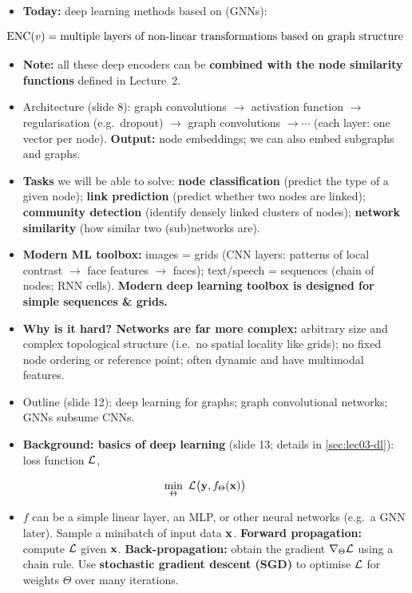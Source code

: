 \begin{itemize}
  \item \textbf{Today:} deep learning methods based on  (GNNs):
\end{itemize}
\begin{equation}\label{eq:lec03-enc}
  \operatorname{ENC}(v) = \text{multiple layers of non-linear transformations based on graph structure}
\end{equation}
\begin{itemize}
  \item \textbf{Note:} all these deep encoders can be \textbf{combined with the
    node similarity functions} defined in Lecture~2.
  \item Architecture (slide 8): graph convolutions $\to$ activation function
    $\to$ regularisation (e.g.\ dropout) $\to$ graph convolutions $\to\cdots$
    (each layer: one vector per node). \textbf{Output:} node embeddings; we can
    also embed subgraphs and graphs.
  \item \textbf{Tasks} we will be able to solve: \textbf{node classification}
    (predict the type of a given node); \textbf{link prediction} (predict
    whether two nodes are linked); \textbf{community detection} (identify
    densely linked clusters of nodes); \textbf{network similarity} (how
    similar two (sub)networks are).
  \item \textbf{Modern ML toolbox:} images = grids (CNN layers: patterns of
    local contrast $\to$ face features $\to$ faces); text/speech = sequences
    (chain of nodes; RNN cells). \textbf{Modern deep learning toolbox is designed for
    simple sequences \& grids.}
  \item \textbf{Why is it hard? Networks are far more complex:} arbitrary size
    and complex topological structure (i.e.\ no spatial locality like grids);
    no fixed node ordering or reference point; often dynamic and have
    multimodal features.
  \item Outline (slide 12): deep learning for graphs; graph convolutional
    networks; GNNs subsume CNNs.
  \item \textbf{Background: basics of deep learning} (slide 13; details in
    \cref{sec:lec03-dl}): loss function $\mathcal{L}$,
\end{itemize}
\begin{equation}\label{eq:lec03-dl-recipe}
  \min_{\Theta}\ \mathcal{L}\bigl(\mathbf{y}, f_\Theta(\mathbf{x})\bigr)
\end{equation}
\begin{itemize}
  \item $f$ can be a simple linear layer, an MLP, or other neural networks
    (e.g.\ a GNN later). Sample a minibatch of input data $\mathbf{x}$.
    \textbf{Forward propagation:} compute $\mathcal{L}$ given $\mathbf{x}$.
    \textbf{Back-propagation:} obtain the gradient $\nabla_\Theta\mathcal{L}$ using a
    chain rule. Use \textbf{stochastic gradient descent (SGD)} to optimise
    $\mathcal{L}$ for weights $\Theta$ over many iterations.
\end{itemize}

